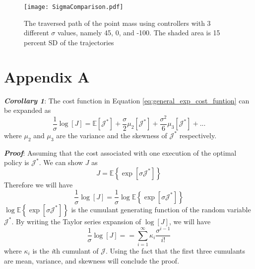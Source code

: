 \documentclass[letterpaper, 10 pt, conference]{ieeeconf}
\begin{document}







\onecolumn

\begin{figure*} [tpb]
\centering
\texttt{[image: SigmaComparison.pdf]}
\caption{The traversed path of the point mass using controllers with 3 different $\sigma$ values, namely 45, 0, and -100. The shaded area is 15 percent SD of the trajectories}
\label{fig:sigma_comparison}
\end{figure*}


\section{Appendix A}
\textbf{\textit{Corollary 1}}: The cost function in Equation \eqref{eq:general_exp_cost_funtion} can be expanded as
\begin{equation}
\frac{1}{\sigma} \log [J] = \mathbb{E}[\mathcal{J}^*] + \frac{\sigma}{2} \mathbb{\mu}_2[\mathcal{J}^*] + \frac{\sigma^2}{6} \mathbb{\mu}_3[\mathcal{J}^*] + ...
\end{equation}
where $\mathbb{\mu}_2$ and $\mathbb{\mu}_3$ are the variance and the skewness of
$\mathcal{J^*}$ respectively.

\textbf{\textit{Proof}}: Assuming that the cost associated with one execution of
the optimal policy is $\mathcal{J}^*$. We can show $J$ as
\begin{equation}
J = \mathbb{E}\left\{\exp[\sigma \mathcal{J}^*]\right\}
\end{equation}
Therefore we will have
\begin{equation}
\frac{1}{\sigma} \log [J] = \frac{1}{\sigma} \log \mathbb{E}\left\{\exp[\sigma \mathcal{J}^*]\right\}
\end{equation}
$\log \mathbb{E}\left\{\exp[\sigma \mathcal{J}^*]\right\}$ is the cumulant
generating function of the random variable $\mathcal{J}^*$. By writing the Taylor
series expansion of $\log [J]$, we will have
\begin{equation}
\frac{1}{\sigma} \log [J] = = \sum_{i=1}^{\infty}{\kappa_i \frac{\sigma^{i-1}}{i!}}
\end{equation}
where $\kappa_i$ is the \textit{i}th cumulant of $\mathcal{J}$. Using the fact
that the first three cumulants are mean, variance, and skewness will conclude the
proof.
\end{document}
